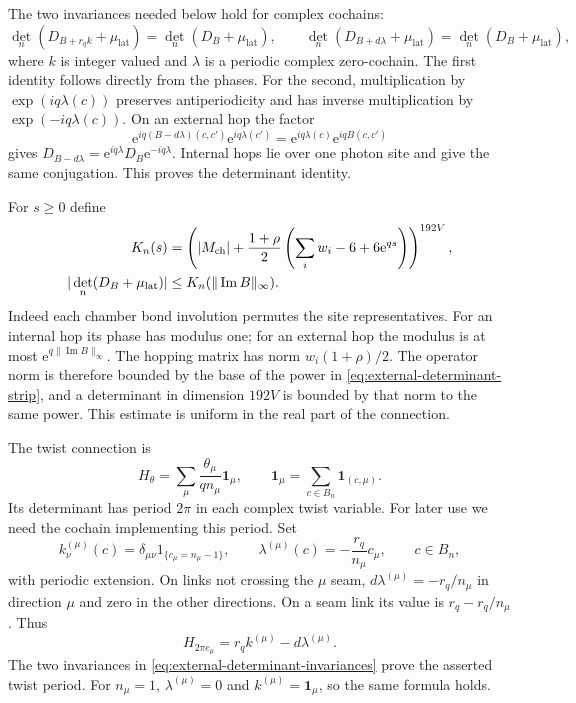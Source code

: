 The two invariances needed below hold for complex cochains:
\begin{equation}\label{eq:external-determinant-invariances}
 \det_n(D_{B+r_qk}+\mu_{\mathrm{lat}})
       =\det_n(D_B+\mu_{\mathrm{lat}}),\qquad
 \det_n(D_{B+d\lambda}+\mu_{\mathrm{lat}})
       =\det_n(D_B+\mu_{\mathrm{lat}}),
\end{equation}
where $k$ is integer valued and $\lambda$ is a periodic complex
zero-cochain. The first identity follows directly from the phases.
For the second, multiplication by $\exp(iq\lambda(c))$ preserves
antiperiodicity and has inverse multiplication by
$\exp(-iq\lambda(c))$. On an external hop the factor
\[
 \mathrm e^{iq(B-d\lambda)(c,c')}\mathrm e^{iq\lambda(c')}
                                  =\mathrm e^{iq\lambda(c)}\mathrm e^{iqB(c,c')}
\]
gives $D_{B-d\lambda}=\mathrm e^{iq\lambda}D_B\mathrm e^{-iq\lambda}$.
Internal hops lie over one photon site and give the same
conjugation. This proves the determinant identity.

For $s\ge0$ define
\begin{align}
 K_n(s)&=
 \left(|M_{\mathrm{ch}}|+\frac{1+\rho}{2}
           \left(\sum_iw_i-6+6\mathrm e^{qs}\right)\right)^{192V},
           \notag\\
 |\det_n(D_B+\mu_{\mathrm{lat}})|
                   &\le K_n(\|\operatorname{Im}B\|_\infty).
                   \label{eq:external-determinant-strip}
\end{align}
Indeed each chamber bond involution permutes the site representatives.
For an internal hop its phase has modulus one; for an external
hop the modulus is at most $\mathrm e^{q\|\operatorname{Im}B\|_\infty}$.
The hopping matrix has norm $w_i(1+\rho)/2$. The operator norm
is therefore bounded by the base of the power in
\eqref{eq:external-determinant-strip}, and a determinant in dimension
$192V$ is bounded by that norm to the same power.
This estimate is uniform in the real part of the connection.

The twist connection is
\begin{equation}\label{eq:external-twist}
 H_\theta=\sum_\mu\frac{\theta_\mu}{qn_\mu}\mathbf1_\mu,
 \qquad
 \mathbf1_\mu=\sum_{c\in B_n}\mathbf1_{(c,\mu)}.
\end{equation}
Its determinant has period $2\pi$ in each complex twist variable.
For later use we need the cochain implementing this period. Set
\[
 k^{(\mu)}_\nu(c)=\delta_{\mu\nu}1_{\{c_\mu=n_\mu-1\}},
 \qquad
 \lambda^{(\mu)}(c)=-\frac{r_q}{n_\mu}c_\mu,\qquad c\in B_n,
\]
with periodic extension. On links not crossing the $\mu$ seam,
$d\lambda^{(\mu)}=-r_q/n_\mu$ in direction $\mu$ and zero
in the other directions. On a seam link its value is
$r_q-r_q/n_\mu$. Thus
\begin{equation}\label{eq:external-twist-period}
 H_{2\pi e_\mu}=r_qk^{(\mu)}-d\lambda^{(\mu)}.
\end{equation}
The two invariances in
\eqref{eq:external-determinant-invariances} prove the asserted
twist period. For $n_\mu=1$, $\lambda^{(\mu)}=0$ and
$k^{(\mu)}=\mathbf1_\mu$, so the same formula holds.

